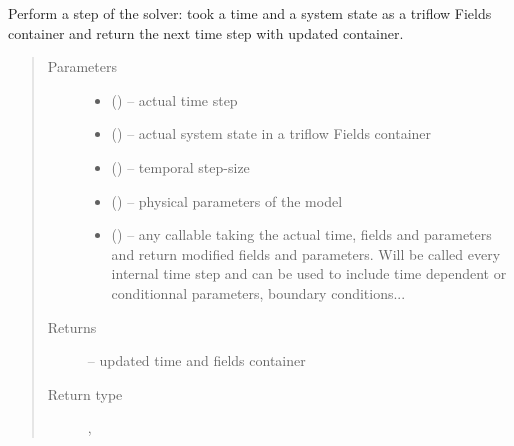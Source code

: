 \documentclass[letterpaper,10pt,english]{sphinxmanual}
\begin{document}
\begin{fulllineitems}
\begin{fulllineitems}
\label{\detokenize{triflow.plugins:triflow.plugins.schemes.Theta.__call__}}
Perform a step of the solver: took a time and a system state as a
triflow Fields container and return the next time step with updated
container.
\begin{quote}\begin{description}
\item[{Parameters}] \leavevmode\begin{itemize}
\item {} 
 () -- actual time step

\item {} 
 () -- actual system state in a triflow Fields container

\item {} 
 () -- temporal step-size

\item {} 
 () -- physical parameters of the model

\item {} 
 (\sphinxstyleliteralemphasis{, }) -- any callable taking the actual time, fields and parameters and return modified fields and parameters. Will be called every internal time step and can be used to include time dependent or conditionnal parameters, boundary conditions...

\end{itemize}

\item[{Returns}] \leavevmode
{} -- updated time and fields container

\item[{Return type}] \leavevmode
{\hyperref[\detokenize{triflow.core:triflow.core.simulation.Simulation.t}]{}}, {\hyperref[\detokenize{triflow.core:module-triflow.core.fields}]{}}

\end{description}\end{quote}

\end{fulllineitems}


\end{fulllineitems}
\end{document}
